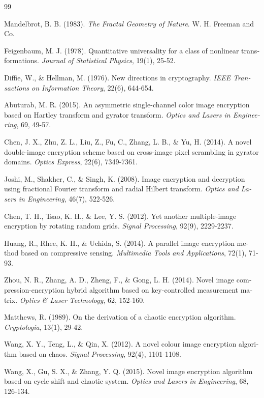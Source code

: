 \begin{thebibliography}{99}
\begin{LTRbibitems}
\begin{latin}
 Mandelbrot, B. B. (1983). \textit{The Fractal Geometry of Nature}. W. H. Freeman and Co.

 Feigenbaum, M. J. (1978). Quantitative universality for a class of nonlinear transformations. \textit{Journal of Statistical Physics}, 19(1), 25-52.

 Diffie, W., \& Hellman, M. (1976). New directions in cryptography. \textit{IEEE Transactions on Information Theory}, 22(6), 644-654.

 Abuturab, M. R. (2015). An asymmetric single-channel color image encryption based on Hartley transform and gyrator transform. \textit{Optics and Lasers in Engineering}, 69, 49-57.

 Chen, J. X., Zhu, Z. L., Liu, Z., Fu, C., Zhang, L. B., \& Yu, H. (2014). A novel double-image encryption scheme based on cross-image pixel scrambling in gyrator domains. \textit{Optics Express}, 22(6), 7349-7361.

 Joshi, M., Shakher, C., \& Singh, K. (2008). Image encryption and decryption using fractional Fourier transform and radial Hilbert transform. \textit{Optics and Lasers in Engineering}, 46(7), 522-526.

 Chen, T. H., Tsao, K. H., \& Lee, Y. S. (2012). Yet another multiple-image encryption by rotating random grids. \textit{Signal Processing}, 92(9), 2229-2237.

 Huang, R., Rhee, K. H., \& Uchida, S. (2014). A parallel image encryption method based on compressive sensing. \textit{Multimedia Tools and Applications}, 72(1), 71-93.

 Zhou, N. R., Zhang, A. D., Zheng, F., \& Gong, L. H. (2014). Novel image compression-encryption hybrid algorithm based on key-controlled measurement matrix. \textit{Optics \& Laser Technology}, 62, 152-160.

 Matthews, R. (1989). On the derivation of a chaotic encryption algorithm. \textit{Cryptologia}, 13(1), 29-42.

 Wang, X. Y., Teng, L., \& Qin, X. (2012). A novel colour image encryption algorithm based on chaos. \textit{Signal Processing}, 92(4), 1101-1108.

 Wang, X., Gu, S. X., \& Zhang, Y. Q. (2015). Novel image encryption algorithm based on cycle shift and chaotic system. \textit{Optics and Lasers in Engineering}, 68, 126-134.


\end{latin}
\end{LTRbibitems}
\end{thebibliography}
